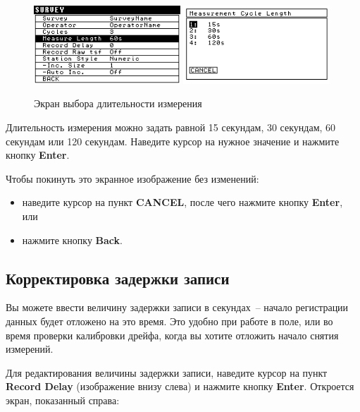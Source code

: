 \newpage
\begin{figure}[H]
  \centering
  \includegraphics[width=0.49\textwidth]{figures/the_measure_length_screen_1}
  \includegraphics[width=0.49\textwidth]{figures/the_measure_length_screen_2}
  \caption{Экран выбора длительности измерения}
  \label{fig:the_measure_length_screen}
\end{figure}

Длительность измерения можно задать равной 15 секундам, 30 секундам, 60 секундам
или 120 секундам. Наведите курсор на нужное значение и нажмите кнопку
\textbf{Enter}.

Чтобы покинуть это экранное изображение без изменений:
\begin{itemize}
  \item наведите курсор на пункт \textbf{CANCEL}, после чего нажмите кнопку
    \textbf{Enter}, или

  \item нажмите кнопку \textbf{Back}.
\end{itemize}

\subsection{Корректировка задержки записи}

Вы можете ввести величину задержки записи в секундах~-- начало регистрации
данных будет отложено на это время. Это удобно при работе в поле, или во время
проверки калибровки дрейфа, когда вы хотите отложить начало снятия измерений.

Для редактирования величины задержки записи, наведите курсор на пункт
\textbf{Record Delay} (изображение внизу слева) и нажмите кнопку \textbf{Enter}.
Откроется экран, показанный справа:

